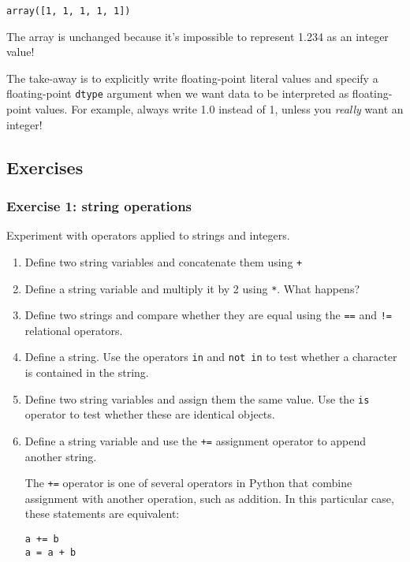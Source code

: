 \documentclass{scrartcl}
\makeatletter
\newcommand{\boxspacing}{\kern\kvtcb@left@rule\kern\kvtcb@boxsep}
\newcommand{\prompt}[4]{
        {\ttfamily\llap{{\color{#2}[#3]:\hspace{3pt}#4}}\vspace{-\baselineskip}}
    }
\makeatother
\begin{document}
            \begin{tcolorbox}[breakable, size=fbox, boxrule=.5pt, pad at break*=1mm, opacityfill=0]
\prompt{Out}{outcolor}{58}{\boxspacing}
\begin{Verbatim}[commandchars=\\\{\}]
array([1, 1, 1, 1, 1])
\end{Verbatim}
\end{tcolorbox}
        
    The array is unchanged because it's impossible to represent 1.234 as an
integer value!

The take-away is to explicitly write floating-point literal values and
specify a floating-point \texttt{dtype} argument when we want data to be
interpreted as floating-point values. For example, always write 1.0
instead of 1, unless you \emph{really} want an integer!


\hypertarget{exercises}{%
\subsection{Exercises}\label{exercises}}

    \hypertarget{exercise-1-string-operations}{%
\subsubsection{Exercise 1: string
operations}\label{exercise-1-string-operations}}

Experiment with operators applied to strings and integers.

\begin{enumerate}
\def\labelenumi{\arabic{enumi}.}
\item
  Define two string variables and concatenate them using \texttt{+}
\item
  Define a string variable and multiply it by 2 using \texttt{*}. What
  happens?
\item
  Define two strings and compare whether they are equal using the
  \texttt{==} and \texttt{!=} relational operators.
\item
  Define a string. Use the operators \texttt{in} and \texttt{not\ in} to
  test whether a character is contained in the string.
\item
  Define two string variables and assign them the same value. Use the
  \texttt{is} operator to test whether these are identical objects.
\item
  Define a string variable and use the \texttt{+=} assignment operator
  to append another string.

  The \texttt{+=} operator is one of several operators in Python that
  combine assignment with another operation, such as addition. In this
  particular case, these statements are equivalent:

\begin{verbatim}
a += b
a = a + b
\end{verbatim}
\end{enumerate}
\end{document}
